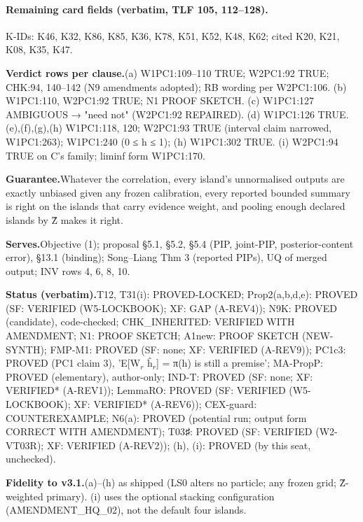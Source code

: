 \paragraph{Remaining card fields (verbatim, TLF 105, 112–128).}
{\small
\par\noindent K-IDs: K46, K32, K86, K85, K36, K78, K51, K52, K48, K62; cited K20, K21, K08, K35, K47.
\par\smallskip\noindent\textbf{Verdict rows per clause.}\enspace (a) W1PC1:109–110 TRUE; W2PC1:92 TRUE; CHK:94, 140–142 (N9 amendments adopted); RB wording per W2PC1:106. (b) W1PC1:110, W2PC1:92 TRUE; N1 PROOF SKETCH. (c) W1PC1:127 AMBIGUOUS → "need not" (W2PC1:92 REPAIRED). (d) W1PC1:126 TRUE. (e),(f),(g),(h) W1PC1:118, 120; W2PC1:93 TRUE (interval claim narrowed, W1PC1:263); W1PC1:240 (0 ≤ h ≤ 1); (h) W1PC1:302 TRUE. (i) W2PC1:94 TRUE on C's family; liminf form W1PC1:170.
\par\smallskip\noindent\textbf{Guarantee.}\enspace Whatever the correlation, every island's unnormalised outputs are exactly unbiased given any frozen calibration, every reported bounded summary is right on the islands that carry evidence weight, and pooling enough declared islands by Ẑ makes it right.
\par\smallskip\noindent\textbf{Serves.}\enspace Objective (1); proposal §5.1, §5.2, §5.4 (PIP, joint-PIP, posterior-content error), §13.1 (binding); Song–Liang Thm 3 (reported PIPs), UQ of merged output; INV rows 4, 6, 8, 10.
\par\smallskip\noindent\textbf{Status (verbatim).}\enspace T12, T31(i): PROVED-LOCKED; Prop2(a,b,d,e): PROVED (SF: VERIFIED (W5-LOCKBOOK); XF: GAP (A-REV4)); N9K: PROVED (candidate), code-checked; CHK\_INHERITED: VERIFIED WITH AMENDMENT; N1: PROOF SKETCH; A1new: PROOF SKETCH (NEW-SYNTH); FMP-M1: PROVED (SF: none; XF: VERIFIED (A-REV9)); PC1c3: PROVED (PC1 claim 3), 'E[W$_{r}$ ĥ$_{r}$] = π(h) is still a premise'; MA-PropP: PROVED (elementary), author-only; IND-T: PROVED (SF: none; XF: VERIFIED* (A-REV1)); LemmaRO: PROVED (SF: VERIFIED (W5-LOCKBOOK); XF: VERIFIED* (A-REV6)); CEX-guard: COUNTEREXAMPLE; N6(a): PROVED (potential run; output form CORRECT WITH AMENDMENT); T03♯: PROVED (SF: VERIFIED (W2-VT03R); XF: VERIFIED (A-REV2)); (h), (i): PROVED (by this seat, unchecked).
\par\smallskip\noindent\textbf{Fidelity to v3.1.}\enspace (a)–(h) as shipped (LS0 alters no particle; any frozen grid; Ẑ-weighted primary). (i) uses the optional stacking configuration (AMENDMENT\_HQ\_02), not the default four islands.
}
